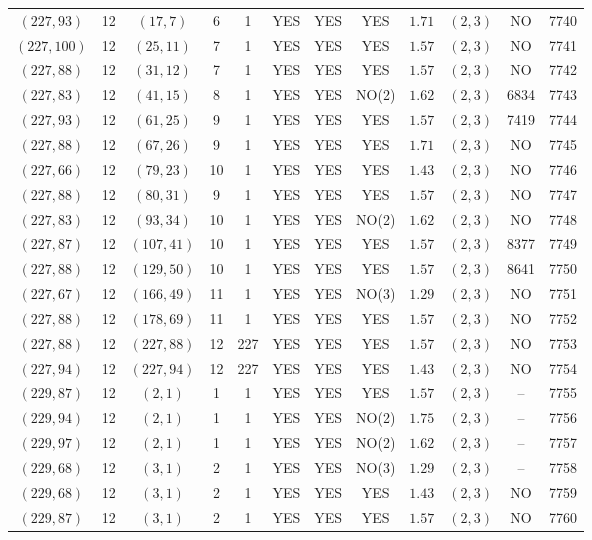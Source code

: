 \begin{longtable}{|c|c|c|c|c|c|c|c|c|c|c|c|}
$(227,93)$ & 12 & $(17,7)$ & 6 & 1 & YES & YES & YES & $1.71$ & $(2,3)$ & NO & 7740\\
$(227,100)$ & 12 & $(25,11)$ & 7 & 1 & YES & YES & YES & $1.57$ & $(2,3)$ & NO & 7741\\
$(227,88)$ & 12 & $(31,12)$ & 7 & 1 & YES & YES & YES & $1.57$ & $(2,3)$ & NO & 7742\\
$(227,83)$ & 12 & $(41,15)$ & 8 & 1 & YES & YES & NO(2) & $1.62$ & $(2,3)$ & 6834 & 7743\\
$(227,93)$ & 12 & $(61,25)$ & 9 & 1 & YES & YES & YES & $1.57$ & $(2,3)$ & 7419 & 7744\\
$(227,88)$ & 12 & $(67,26)$ & 9 & 1 & YES & YES & YES & $1.71$ & $(2,3)$ & NO & 7745\\
$(227,66)$ & 12 & $(79,23)$ & 10 & 1 & YES & YES & YES & $1.43$ & $(2,3)$ & NO & 7746\\
$(227,88)$ & 12 & $(80,31)$ & 9 & 1 & YES & YES & YES & $1.57$ & $(2,3)$ & NO & 7747\\
$(227,83)$ & 12 & $(93,34)$ & 10 & 1 & YES & YES & NO(2) & $1.62$ & $(2,3)$ & NO & 7748\\
$(227,87)$ & 12 & $(107,41)$ & 10 & 1 & YES & YES & YES & $1.57$ & $(2,3)$ & 8377 & 7749\\
$(227,88)$ & 12 & $(129,50)$ & 10 & 1 & YES & YES & YES & $1.57$ & $(2,3)$ & 8641 & 7750\\
$(227,67)$ & 12 & $(166,49)$ & 11 & 1 & YES & YES & NO(3) & $1.29$ & $(2,3)$ & NO & 7751\\
$(227,88)$ & 12 & $(178,69)$ & 11 & 1 & YES & YES & YES & $1.57$ & $(2,3)$ & NO & 7752\\
$(227,88)$ & 12 & $(227,88)$ & 12 & 227 & YES & YES & YES & $1.57$ & $(2,3)$ & NO & 7753\\
$(227,94)$ & 12 & $(227,94)$ & 12 & 227 & YES & YES & YES & $1.43$ & $(2,3)$ & NO & 7754\\
$(229,87)$ & 12 & $(2,1)$ & 1 & 1 & YES & YES & YES & $1.57$ & $(2,3)$ & -- & 7755\\
$(229,94)$ & 12 & $(2,1)$ & 1 & 1 & YES & YES & NO(2) & $1.75$ & $(2,3)$ & -- & 7756\\
$(229,97)$ & 12 & $(2,1)$ & 1 & 1 & YES & YES & NO(2) & $1.62$ & $(2,3)$ & -- & 7757\\
$(229,68)$ & 12 & $(3,1)$ & 2 & 1 & YES & YES & NO(3) & $1.29$ & $(2,3)$ & -- & 7758\\
$(229,68)$ & 12 & $(3,1)$ & 2 & 1 & YES & YES & YES & $1.43$ & $(2,3)$ & NO & 7759\\
$(229,87)$ & 12 & $(3,1)$ & 2 & 1 & YES & YES & YES & $1.57$ & $(2,3)$ & NO & 7760\\

\end{longtable}
